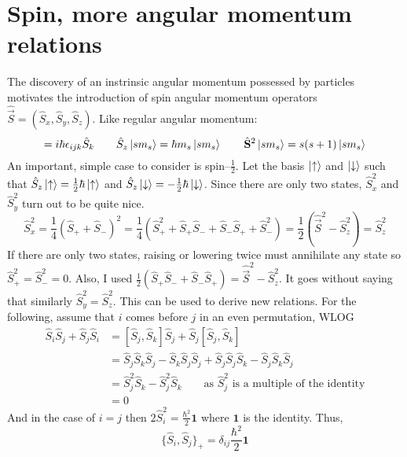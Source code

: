\documentclass{article}
\begin{document}
\section{Spin, more angular momentum relations}
The discovery of an instrinsic angular momentum possessed by particles motivates the introduction of spin angular momentum operators $\hat{\vec{S}} = (\hat{S}_x, \hat{S}_y, \hat{S}_z)$. Like regular angular momentum:
\begin{equation*}
[\hat{S}_i, \hat{S}_j] = i\hbar\epsilon_{ijk}\hat{S}_k \qquad \hat{S}_z \ket{sm_s} = \hbar m_s \ket{sm_s} \qquad \hat{\vec{S}}^2 \ket{sm_s} = s(s+1)\ket{sm_s}
\end{equation*}
An important, simple case to consider is spin--$\frac{1}{2}$. Let the basis $\ket{\uparrow}$ and $\ket{\downarrow}$ such that $\hat{S}_z \ket{\uparrow} = \frac{1}{2}\hbar\ket{\uparrow}$ and $\hat{S}_z \ket{\downarrow} = -\frac{1}{2}\hbar\ket{\downarrow}$. Since there are only two states, $\hat{S}_x^2$ and $\hat{S}_y^2$ turn out to be quite nice. 
\begin{equation*}
\hat{S}_x^2 = \frac{1}{4}(\hat{S}_+ + \hat{S}_-)^2 = \frac{1}{4}(\hat{S}_+^2 + \hat{S}_+\hat{S}_- + \hat{S}_-\hat{S}_+ + \hat{S}_-^2) = \frac{1}{2}(\hat{\vec{S}}^2 - \hat{S}_z^2) = \hat{S}_z^2
\end{equation*}
If there are only two states, raising or lowering twice must annihilate any state so $\hat{S}_+^2 = \hat{S}_-^2 = 0$. Also, I used $\frac{1}{2}(\hat{S}_+\hat{S}_- + \hat{S}_-\hat{S}_+) = \hat{\vec{S}}^2 - \hat{S}_z^2$. It goes without saying that similarly $\hat{S}_y^2 = \hat{S}_z^2$. This can be used to derive new relations. For the following, assume that $i$ comes before $j$ in an even permutation, WLOG
\begin{align*}
\hat{S}_i\hat{S}_j + \hat{S}_j\hat{S}_i &= [\hat{S}_j, \hat{S}_k]\hat{S}_j + \hat{S}_j[\hat{S}_j, \hat{S}_k] \\
&= \hat{S}_j\hat{S}_k\hat{S}_j - \hat{S}_k\hat{S}_j\hat{S}_j + \hat{S}_j\hat{S}_j\hat{S}_k -\hat{S}_j\hat{S}_k\hat{S}_j \\
&= \hat{S}_j^2\hat{S}_k - \hat{S}_j^2\hat{S}_k \qquad \text{as } \hat{S}_j^2 \text{ is a multiple of the identity} \\
&= 0
\end{align*}
And in the case of $i=j$ then $2\hat{S}_i^2 = \frac{\hbar^2}{2} \mathbf{1}$ where $\mathbf{1}$ is the identity. Thus,
\begin{equation*}
\{\hat{S}_i, \hat{S}_j\}_+ = \delta_{ij} \frac{\hbar^2}{2} \mathbf{1}
\end{equation*}
\end{document}
